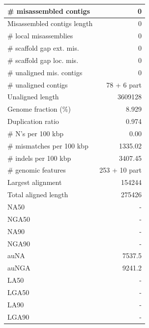\documentclass[12pt,a4paper]{article}
\begin{document}
\begin{table}[ht]
\begin{center}
\begin{tabular}{|l*{1}{|r}|}
\# misassembled contigs & 0 \\ \hline
Misassembled contigs length & 0 \\ \hline
\# local misassemblies & 0 \\ \hline
\# scaffold gap ext. mis. & 0 \\ \hline
\# scaffold gap loc. mis. & 0 \\ \hline
\# unaligned mis. contigs & 0 \\ \hline
\# unaligned contigs & 78 + 6 part \\ \hline
Unaligned length & 3609128 \\ \hline
Genome fraction (\%) & 8.929 \\ \hline
Duplication ratio & 0.974 \\ \hline
\# N's per 100 kbp & 0.00 \\ \hline
\# mismatches per 100 kbp & 1335.02 \\ \hline
\# indels per 100 kbp & 3407.45 \\ \hline
\# genomic features & 253 + 10 part \\ \hline
Largest alignment & 154244 \\ \hline
Total aligned length & 275426 \\ \hline
NA50 & - \\ \hline
NGA50 & - \\ \hline
NA90 & - \\ \hline
NGA90 & - \\ \hline
auNA & 7537.5 \\ \hline
auNGA & 9241.2 \\ \hline
LA50 & - \\ \hline
LGA50 & - \\ \hline
LA90 & - \\ \hline
LGA90 & - \\ \hline
\end{tabular}
\end{center}
\end{table}
\end{document}
